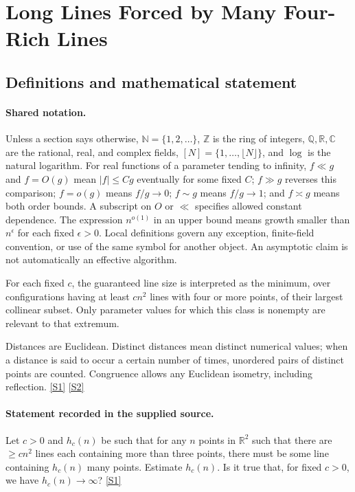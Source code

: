 \documentclass[11pt,a4paper]{article}
\newcommand{\N}{\mathbb{N}}
\newcommand{\Z}{\mathbb{Z}}
\newcommand{\Q}{\mathbb{Q}}
\newcommand{\R}{\mathbb{R}}
\newcommand{\C}{\mathbb{C}}
\newcommand{\sref}[2]{\hyperlink{source:#1:#2}{[S#2]}}
\begin{document}
\section{Long Lines Forced by Many Four-Rich Lines}\label{statement}


\subsection{Definitions and mathematical statement}

\paragraph{Shared notation.}Unless a section says otherwise, $\N=\{1,2,\ldots\}$,
$\Z$ is the ring of integers, $\Q,\R,\C$ are the rational, real, and complex
fields, $[N]=\{1,\ldots,\lfloor N\rfloor\}$, and $\log$ is the natural
logarithm. For real functions of a parameter tending to infinity,
$f\ll g$ and $f=O(g)$ mean $|f|\leq Cg$ eventually for some fixed $C$;
$f\gg g$ reverses this comparison; $f=o(g)$ means $f/g\to0$;
$f\sim g$ means $f/g\to1$; and $f\asymp g$ means both order bounds.
A subscript on $O$ or $\ll$ specifies allowed constant dependence.
The expression $n^{o(1)}$ in an upper bound means growth smaller than
$n^\epsilon$ for each fixed $\epsilon>0$. Local definitions govern any
exception, finite-field convention, or use of the same symbol for another
object. An asymptotic claim is not automatically an effective algorithm.



For each fixed $c$, the guaranteed line size is interpreted as the minimum, over configurations having at least $cn^2$ lines with four or more points, of their largest collinear subset. Only parameter values for which this class is nonempty are relevant to that extremum.

Distances are Euclidean. Distinct distances mean distinct numerical values; when a distance is said to occur a certain number of times, unordered pairs of distinct points are counted. Congruence allows any Euclidean isometry, including reflection. \sref{statement}{1} \sref{statement}{2}

\paragraph{Statement recorded in the supplied source.}
Let $c>0$ and $h_c(n)$ be such that for any $n$ points in $\mathbb{R}^2$ such that there are $\geq cn^2$ lines each containing more than three points, there must be some line containing $h_c(n)$ many points. Estimate $h_c(n)$. Is it true that, for fixed $c>0$, we have $h_c(n)\to \infty$? \sref{statement}{1}
\end{document}
